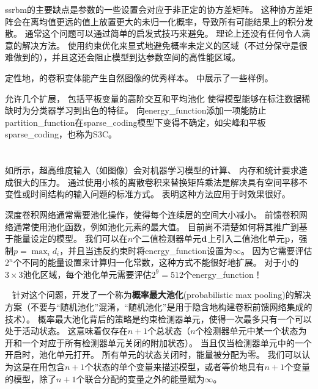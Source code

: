 \gls{ssrbm}的主要缺点是参数的一些设置会对应于非正定的协方差矩阵。
这种协方差矩阵会在离均值更远的值上放置更大的未归一化概率，导致所有可能结果上的积分发散。
通常这个问题可以通过简单的启发式技巧来避免。
理论上还没有任何令人满意的解决方法。
使用约束优化来显式地避免概率未定义的区域（不过分保守是很难做到的），并且这还会阻止模型到达参数空间的高性能区域。

定性地，的卷积变体能产生自然图像的优秀样本。
中展示了一些样例。

允许几个扩展，
包括平板变量的高阶交互和平均池化\citep{courville-al-ieee14} 使得模型能够在标注数据稀缺时为分类器学习到出色的特征。
向\gls{energy_function}添加一项能防止\gls{partition_function}在\gls{sparse_coding}模型下变得不确定，如尖峰和平板\gls{sparse_coding}\citep{Goodfeli-et-al-TPAMI-Deep-PrePrint-2013}，也称为S3C。


\section{}
\label{sec:convolutional_boltzmann_machines}

如所示，超高维度输入（如图像）会对机器学习模型的计算、 内存和统计要求造成很大的压力。
通过使用小核的离散卷积来替换矩阵乘法是解决具有空间平移不变性或时间结构的输入问题的标准方式。
\citet{Desjardins-2008} 表明这种方法应用于时效果很好。

深度卷积网络通常需要池化操作，使得每个连续层的空间大小减小。
前馈卷积网络通常使用池化函数，例如池化元素的最大值。
目前尚不清楚如何将其推广到基于能量设定的模型。
我们可以在$n$个二值检测器单元$\mathbf{d}$上引入二值池化单元$\mathrm{p}$，强制$p = \max_i d_i$，并且当违反约束时将\gls{energy_function}设置为$\infty$。
因为它需要评估$2^n$个不同的能量设置来计算归一化常数，这种方式不能很好地扩展。
对于小的$3\times3$池化区域，每个池化单元需要评估$2^9 = 512$个\gls{energy_function}！


~\citet{HonglakL2009} 针对这个问题，开发了一个称为\textbf{概率最大池化}(probabilistic max pooling)的解决方案（不要与``随机池化''混淆，``随机池化''是用于隐含地构建卷积前馈网络集成的技术）。
概率最大池化背后的策略是约束检测器单元，使得一次最多只有一个可以处于活动状态。
这意味着仅存在$n + 1$个总状态（$n$个检测器单元中某一个状态为开和一个对应于所有检测器单元关闭的附加状态）。
当且仅当检测器单元中的一个开启时，池化单元打开。
所有单元的状态关闭时，能量被分配为零。
我们可以认为这是在用包含$n + 1$个状态的单个变量来描述模型，或者等价地具有$n + 1$个变量的模型，除了$n+1$个联合分配的变量之外的能量赋为$\infty$。

